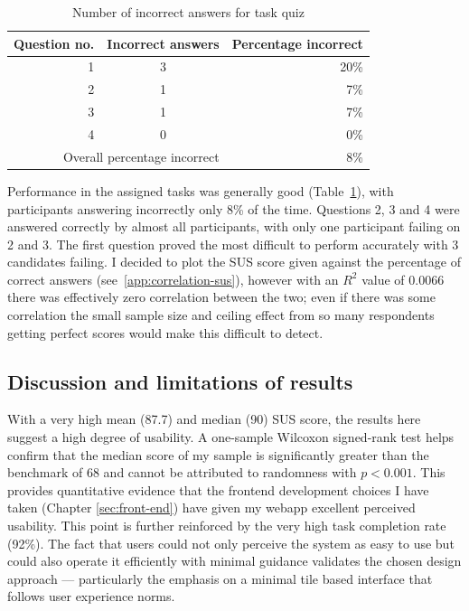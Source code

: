 \begin{table}[H]
  \centering
  \begin{tabular}{r c r}
    \hline
    Question no. & Incorrect answers & Percentage incorrect\\
    \hline
    1 & 3 & 20\%\\
    2 & 1 & 7\% \\
    3 & 1 & 7\% \\
    4 & 0 & 0\% \\
    \hline
    \multicolumn{2}{r}{Overall percentage incorrect} & 8\% \\
    \hline
  \end{tabular}
  \caption{Number of incorrect answers for task quiz}
  \label{tab:correct-metrics}
\end{table}

Performance in the assigned tasks was generally good
(Table~\ref{tab:correct-metrics}), with participants answering incorrectly only
8\% of the time. Questions 2, 3 and 4 were answered correctly by almost all
participants, with only one participant failing on 2 and 3. The first question
proved the most difficult to perform accurately with 3 candidates failing. I
decided to plot the SUS score given against the percentage of correct answers
(see~\ref{app:correlation-sus}), however with an $R^2$ value of 0.0066 there was
effectively zero correlation between the two; even if there was some correlation
the small sample size and ceiling effect from so many respondents getting
perfect scores would make this difficult to detect.

\subsection{Discussion and limitations of results}

With a very high mean (87.7) and median (90) SUS score, the results here suggest
a high degree of usability. A one-sample Wilcoxon signed-rank test helps confirm
that the median score of my sample is significantly greater than the benchmark
of 68 and cannot be attributed to randomness with \(p<0.001\). This provides
quantitative evidence that the frontend development choices I have taken
(Chapter \ref{sec:front-end}) have given my webapp excellent perceived
usability. This point is further reinforced by the very high task completion
rate (92\%). The fact that users could not only perceive the system as easy to
use but could also operate it efficiently with minimal guidance validates the
chosen design approach — particularly the emphasis on a minimal tile based
interface that follows user experience norms.

